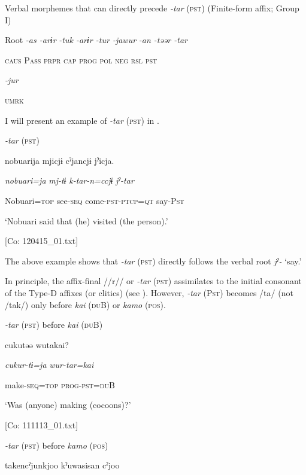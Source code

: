\ea\label{ex:8-55}
  Verbal morphemes that can directly precede \textit{{}-tar} (\textsc{pst}) (Finite-form affix; Group I)

  Root  \textit{{}-as  {}-arɨr} %
\textit{{}-tuk  {}-arɨr  {}-tur  {}-jawur} %
\textit{{}-an  {}-təər  {}-tar}

    \textsc{caus}  P\textsc{ass}  \textsc{prpr}  \textsc{cap}  \textsc{prog}  \textsc{pol}  \textsc{neg}  \textsc{rsl}  \textsc{pst}

          \textit{{}-jur} 

          \textsc{umrk}

I will present an example of \textit{{}-tar} (\textsc{pst}) in .

\ea\label{ex:8-56}
  \textit{{}-tar} (\textsc{pst})

  {\TM}
\glll  nobuarija  mjicjɨ  cˀjancjɨ  jˀicja.

    \textit{nobuari=ja}  \textit{mj-tɨ}  \textit{k-tar-n=ccjɨ}  \textit{jˀ-tar}

    Nobuari=\textsc{top}  see-\textsc{seq}  come-\textsc{pst}-\textsc{ptcp}=\textsc{qt}  say-P\textsc{st}

    ‘Nobuari said that (he) visited (the person).’

    [Co: 120415\_01.txt]
\z

The above example shows that \textit{{}-tar} (\textsc{pst}) directly follows the verbal root \textit{jˀ-} ‘say.’

In principle, the affix-final //r// or \textit{{}-tar} (\textsc{pst}) assimilates to the initial consonant of the Type-D affixes (or clitics) (see ). However, \textit{{}-tar} (P\textsc{st}) becomes /ta/ (not /tak/) only before \textit{kai} (\textsc{du}B) or \textit{kamo} (\textsc{pos}).

\ea\label{ex:8-57}
\ea \textit{{}-tar} (\textsc{pst}) before \textit{kai} (\textsc{du}B)

  {\TM}
\glll  cukutəə  wutakai?

    \textit{cukur-tɨ=ja}  \textit{wur-tar=kai}

    make-\textsc{seq}=\textsc{top}  \textsc{prog}-\textsc{pst}=\textsc{du}B

    ‘Was (anyone) making (cocoons)?’

    [Co: 111113\_01.txt]
\z

\ex \textit{{}-tar} (\textsc{pst}) before \textit{kamo} (\textsc{pos})

  {\TM}
\glll  takencˀjunkjoo  kˀuwasisan  cˀjoo

